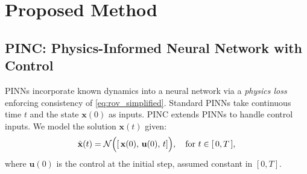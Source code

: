 \documentclass[conference]{IEEEtran}
\begin{document}



\section{Proposed Method} %
\label{sec:method}

\subsection{PINC: Physics-Informed Neural Network with Control}

PINNs \cite{raissi_physics-informed_2019} incorporate known dynamics into a neural network via a \emph{physics loss} enforcing consistency of \eqref{eq:rov_simplified}. Standard PINNs take continuous time $t$ and the state $\mathbf{x}(0)$ as inputs. 
PINC \cite{antonelo_physics-informed_2024} extends PINNs to handle control inputs. We model the solution $\mathbf{x}(t)$ given:
\begin{equation}
\hat{\mathbf{x}}(t) = \mathcal{N}\Bigl(\left[\,\mathbf{x}(0),\,\mathbf{u}(0),\,t\right]\Bigr),
\quad \text{for } t\in[\,0,T\,],
\label{eq:pinc_mapping}
\end{equation}
where $\mathbf{u}(0)$ is the control at the initial step, assumed constant in $[0,T]$. %
\end{document}
